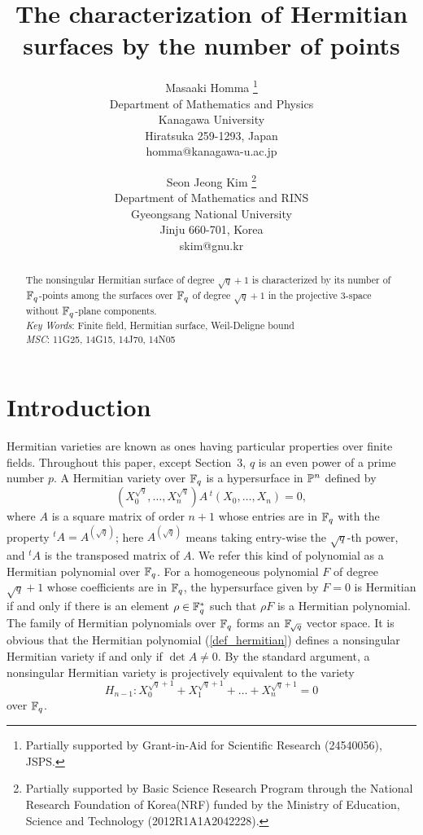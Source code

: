 \documentclass[a4paper,11pt]{article}
\title{The characterization of Hermitian surfaces by the number of points}
\author{
Masaaki Homma
\thanks{Partially supported by Grant-in-Aid
for Scientific Research (24540056), JSPS.}
\\
 Department of Mathematics and Physics\\
Kanagawa University\\
Hiratsuka 259-1293, Japan\\
homma@kanagawa-u.ac.jp
\and
Seon Jeong Kim
\thanks{Partially supported by Basic Science Research Program through the National Research Foundation of Korea(NRF) 
funded by the Ministry of Education, Science and Technology (2012R1A1A2042228).
}\\
 Department of Mathematics and RINS\\
Gyeongsang National University\\
Jinju 660-701, Korea \\
skim@gnu.kr
}
\date{}
\begin{document}
\maketitle
\begin{abstract}
The nonsingular Hermitian surface of degree $\sqrt{q} +1$
is characterized by its number of $\Bbb{F}_q$-points among
the surfaces over $\Bbb{F}_q$ of degree $\sqrt{q} +1$
in the projective 3-space
without $\Bbb{F}_q$-plane components.
\\
{\em Key Words}:
Finite field, Hermitian surface, Weil-Deligne bound
\\
{\em MSC}:
11G25, 14G15, 14J70, 14N05
\end{abstract}

\section{Introduction}
Hermitian varieties are known as ones having particular properties
over finite fields.
Throughout this paper, except Section~3, $q$ is an even power of
a prime number $p$.
A Hermitian variety over ${\Bbb F}_q$ is a hypersurface in ${\Bbb P^n}$
defined by
\begin{equation}\label{def_hermitian}
(X_0^{\sqrt{q}}, \dots , X_n^{\sqrt{q}}) A \, {}^t\!(X_0, \dots , X_n) =0,
\end{equation}
where $A$ is a square matrix of order $n+1$ whose entries are in ${\Bbb F}_q$
with the property ${}^t\!A=A^{(\sqrt{q})}$;
here $A^{(\sqrt{q})}$ means taking entry-wise
the $\sqrt{q}$-th power, and ${}^t\!A$ is the transposed matrix of $A$.
We refer this kind of polynomial as a Hermitian polynomial over ${\Bbb F}_q$.
For a homogeneous polynomial $F$ of degree $\sqrt{q}+1$
whose coefficients are in ${\Bbb F}_q$, the hypersurface given by $F=0$ is
Hermitian if and only if there is an element $\rho \in {\Bbb F}_q^{\ast}$
such that $\rho F$ is a Hermitian polynomial.
The family of Hermitian polynomials over ${\Bbb F}_q$
forms an ${\Bbb F}_{\! \sqrt{q}}$ vector space.
It is obvious that the Hermitian polynomial (\ref{def_hermitian})
defines a nonsingular Hermitian variety if and only if $\det A \neq 0$.
By the standard argument,
a nonsingular Hermitian variety is projectively equivalent to
the variety
\begin{equation}\label{standard_form}
H_{n-1} : X_0^{\sqrt{q}+1} + X_1^{\sqrt{q}+1} 
+ \dots  + X_n^{\sqrt{q}+1} =0
\end{equation}
over ${\Bbb F}_q$.
\end{document}
